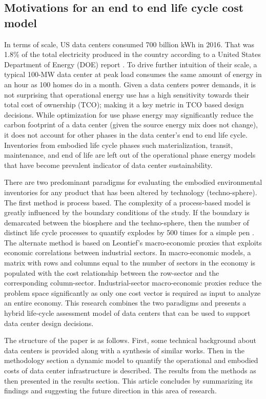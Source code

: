    \subsection{Motivations for an end to end life cycle cost model}
        In terms of scale, US data centers consumed 700 billion kWh in 2016. That was 1.8\% of the total electricity produced in the country according to a United States Department of Energy (DOE) report \cite{Shehabi16}. To drive further intuition of their scale, a typical 100-MW data center at peak load consumes the same amount of energy in an hour as 100 homes do in a month. Given a data centers power demands, it is not surprising that operational energy use has a high sensitivity towards their total cost of ownership (TCO); making it a key metric in TCO based design decisions. While optimization for use phase energy may significantly reduce the carbon footprint of a data center (given the source energy mix does not change), it does not account for other phases in the data center's end to end life cycle. Inventories from embodied life cycle phases such materialization, transit, maintenance, and end of life are left out of the operational phase energy models that have become prevalent indicator of data center sustainability. 

        There are two predominant paradigms for evaluating the embodied environmental inventories for any product that has been altered by technology (techno-sphere). The first method is process based. The complexity of a process-based model is greatly influenced by the boundary conditions of the study. If the boundary is demarcated between the biosphere and the techno-sphere, then the number of distinct life cycle processes to quantify explodes by 500 times for a simple pen \cite{shah11}. The alternate method is based on Leontief's macro-economic proxies that exploits economic correlations between industrial sectors. In macro-economic models, a matrix with rows and columns equal to the number of sectors in the economy is populated with the cost relationship between the row-sector and the corresponding column-sector. Industrial-sector macro-economic proxies reduce the problem space significantly as only one cost vector is required as input to analyze an entire economy. This research combines the two paradigms and presents a hybrid life-cycle assessment model of data centers that can be used to support data center design decisions. 

        The structure of the paper is as follows. First, some technical background about data centers is provided along with a synthesis of similar works. Then in the methodology section a dynamic model to quantify the operational and embodied costs of data center infrastructure is described. The results from the methods as then presented in the results section. This article concludes by summarizing its findings and suggesting the future direction in this area of research. 

